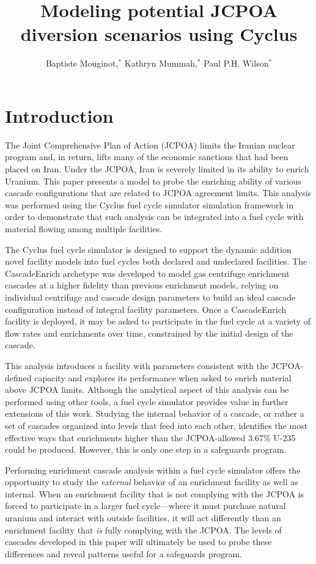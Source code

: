 \documentclass{anstrans}
\title{Modeling potential JCPOA diversion scenarios using Cyclus}
\author{Baptiste Mouginot,$^{*}$ Kathryn Mummah,$^{*}$ Paul P.H. Wilson$^{*}$}
\institute{
$^{*}$University of Wisconsin-Madison, WI
}
\begin{document}
\section{Introduction}

The Joint Comprehensive Plan of Action (JCPOA)\cite{jcpoa} %
limits the Iranian nuclear program and, in return, lifts many of the economic
sanctions that had been placed on Iran. Under the JCPOA, Iran is severely
limited in its ability to enrich Uranium. This paper presents a model to probe
the enriching ability of various cascade configurations that are related to
JCPOA agreement limits. This analysis was performed using the Cyclus fuel cycle
simulator\cite{cyclus} %
simulation framework in order to demonstrate that such analysis can be
integrated into a fuel cycle with material flowing among multiple facilities.

The Cyclus fuel cycle simulator is designed to support the dynamic addition
novel facility models into fuel cycles both declared and undeclared facilities.
The CascadeEnrich archetype\cite{mbmore.2018} was developed to model gas centrifuge
enrichment cascades at a higher fidelity than previous enrichment models,
relying on individual centrifuge and cascade design parameters to build an ideal
cascade configuration instead of integral facility parameters. Once a
CascadeEnrich facility is deployed, it may be asked to participate in the fuel
cycle at a variety of flow rates and enrichments over time, constrained by the
initial design of the cascade.

This analysis introduces a facility with parameters consistent with the
JCPOA-defined capacity and explores its performance when asked to enrich
material above JCPOA limits. Although the analytical aspect of this analysis can
be performed using other tools, a fuel cycle simulator provides value in further
extensions of this work. Studying the internal behavior of a cascade, or rather
a set of cascades organized into levels that feed into each other, identifies
the most effective ways that enrichments higher than the JCPOA-allowed 3.67\%
U-235 could be produced. However, this is only one step in a safeguards program.

Performing enrichment cascade analysis within a fuel cycle simulator offers the
opportunity to study the \textit{external} behavior of an enrichment facility as
well as internal. When an enrichment facility that is not complying with the
JCPOA is forced to participate in a larger fuel cycle---where it must purchase
natural uranium and interact with outside facilities, it will act differently
than an enrichment facility that \textit{is} fully complying with the JCPOA. The
levels of cascades developed in this paper will ultimately be used to probe
these differences and reveal patterns useful for a safeguards program.
\end{document}
